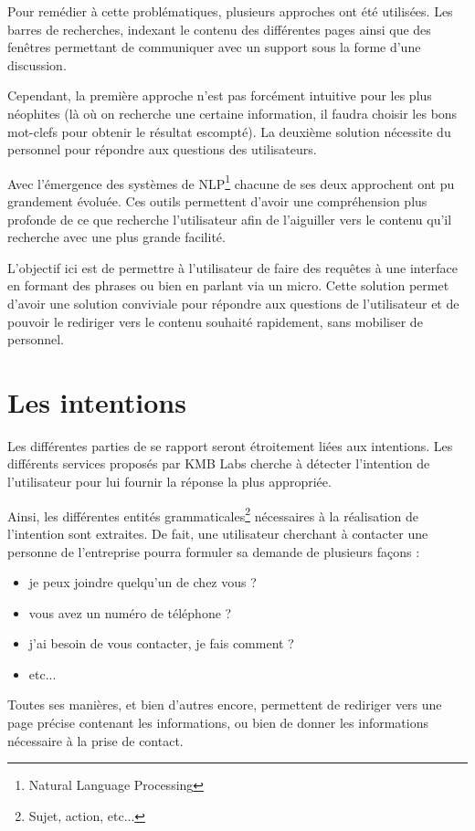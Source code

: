 \documentclass[12pt,a4paper,twoside]{scrreprt}
\begin{document}
Pour remédier à cette problématiques, plusieurs approches ont été utilisées. Les barres de recherches, indexant le contenu des différentes pages ainsi que des fenêtres permettant de communiquer avec un support sous la forme d'une discussion.

Cependant, la première approche n'est pas forcément intuitive pour les plus néophites (là où on recherche une certaine information, il faudra choisir les bons mot-clefs pour obtenir le résultat escompté). La deuxième solution nécessite du personnel pour répondre aux questions des utilisateurs.

Avec l'émergence des systèmes de NLP\footnote{Natural Language Processing} chacune de ses deux approchent ont pu grandement évoluée. Ces outils permettent d'avoir une compréhension plus profonde de ce que recherche l'utilisateur afin de l'aiguiller vers le contenu qu'il recherche avec une plus grande facilité.

L'objectif ici est de permettre à l'utilisateur de faire des requêtes à une interface en formant des phrases ou bien en parlant via un micro. Cette solution permet d'avoir une solution conviviale pour répondre aux questions de l'utilisateur et de pouvoir le rediriger vers le contenu souhaité rapidement, sans mobiliser de personnel.

\section{Les intentions}

Les différentes parties de se rapport seront étroitement liées aux intentions. Les différents services proposés par KMB Labs cherche à détecter l'intention de l'utilisateur pour lui fournir la réponse la plus appropriée.

Ainsi, les différentes entités grammaticales\footnote{Sujet, action, etc...} nécessaires à la réalisation de l'intention sont extraites. De fait, une utilisateur cherchant à contacter une personne de l'entreprise pourra formuler sa demande de plusieurs façons :
\begin{itemize}
	\item \og je peux joindre quelqu'un de chez vous ?\fg{}
	\item \og vous avez un numéro de téléphone ?\fg{}
	\item \og j'ai besoin de vous contacter, je fais comment ?\fg{}
	\item etc...
\end{itemize}

Toutes ses manières, et bien d'autres encore, permettent de rediriger vers une page précise contenant les informations, ou bien de donner les informations nécessaire à la prise de contact.
\end{document}
